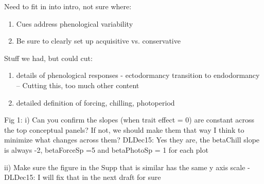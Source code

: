 \documentclass{article}
\begin{document}
Need to fit in into intro, not sure where:
\begin{enumerate}
\item Cues address phenological variability
\item Be sure to clearly set up acquisitive vs. conservative
\end{enumerate}

Stuff we had, but could cut:
\begin{enumerate}
\item details of phenological responses - ectodormancy transition to endodormancy -- Cutting this, too much other content
\item detailed definition of forcing, chilling, photoperiod
\end{enumerate}

Fig 1:
i) Can you confirm the slopes (when trait effect = 0) are constant across the top conceptual panels? If not, we should make them that way I think to minimize what changes across them?
DLDec15: Yes they are, the betaChill slope is always -2, betaForceSp =5 and betaPhotoSp = 1 for each plot

ii) Make sure the figure in the Supp that is similar has the same y axis scale -
DLDec15: I will fix that in the next draft for sure
\end{document}
